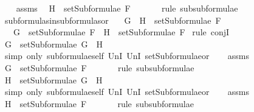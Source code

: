 \begin{isabellebody}
\ \ \isamarkupfalse%
\ assms\ \isamarkupfalse%
\ {\isachardoublequoteopen}H\ {\isasymin}\ setSubformulae\ F{\isachardoublequoteclose}\ \isanewline
\ \ \ \ \isamarkupfalse%
\ {\isacharparenleft}rule\ subsubformulae{\isacharparenright}\isanewline
{}\isamarkupfalse%
%
\endisatagproof
{\isafoldproof}%
%
\isadelimproof
\isanewline
%
\endisadelimproof
\isanewline
{}\isamarkupfalse%
\ subformulas{\isacharunderscore}in{\isacharunderscore}subformulas{\isacharunderscore}or{\isacharcolon}\isanewline
\ \ \ {\isachardoublequoteopen}G\ \isactrlbold {\isasymor}\ H\ {\isasymin}\ setSubformulae\ F{\isachardoublequoteclose}\ \isanewline
\ \ \ {\isachardoublequoteopen}G\ {\isasymin}\ setSubformulae\ F\ {\isasymand}\ H\ {\isasymin}\ setSubformulae\ F{\isachardoublequoteclose}\isanewline
%
\isadelimproof
%
\endisadelimproof
%
\isatagproof
{}\isamarkupfalse%
\ {\isacharparenleft}rule\ conjI{\isacharparenright}\isanewline
\ \ \isamarkupfalse%
\ {\isachardoublequoteopen}G\ {\isasymin}\ setSubformulae\ {\isacharparenleft}G\ \isactrlbold {\isasymor}\ H{\isacharparenright}{\isachardoublequoteclose}\ \isanewline
\ \ \ \ \isamarkupfalse%
\ {\isacharparenleft}simp\ only{\isacharcolon}\ subformulae{\isacharunderscore}self\ UnI{}\ UnI{}\ setSubformulae{\isacharunderscore}or{\isacharparenright}\isanewline
\ \ \isamarkupfalse%
\ assms\ \isamarkupfalse%
\ {\isachardoublequoteopen}G\ {\isasymin}\ setSubformulae\ F{\isachardoublequoteclose}\ \isanewline
\ \ \ \ \isamarkupfalse%
\ {\isacharparenleft}rule\ subsubformulae{\isacharparenright}\isanewline
{}\isamarkupfalse%
\isanewline
\ \ \isamarkupfalse%
\ {\isachardoublequoteopen}H\ {\isasymin}\ setSubformulae\ {\isacharparenleft}G\ \isactrlbold {\isasymor}\ H{\isacharparenright}{\isachardoublequoteclose}\ \ \isanewline
\ \ \ \ \isamarkupfalse%
\ {\isacharparenleft}simp\ only{\isacharcolon}\ subformulae{\isacharunderscore}self\ UnI{}\ UnI{}\ setSubformulae{\isacharunderscore}or{\isacharparenright}\isanewline
\ \ \isamarkupfalse%
\ assms\ \isamarkupfalse%
\ {\isachardoublequoteopen}H\ {\isasymin}\ setSubformulae\ F{\isachardoublequoteclose}\ \isanewline
\ \ \ \ \isamarkupfalse%
\ {\isacharparenleft}rule\ subsubformulae{\isacharparenright}\isanewline
{}\isamarkupfalse%
%
\endisatagproof

\end{isabellebody}
